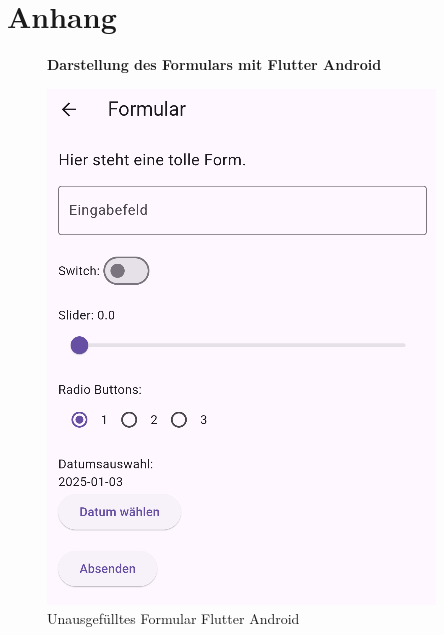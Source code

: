 \section*{Anhang}
\begin{figure}[H]
    \centering
    \textbf{Darstellung des Formulars mit Flutter Android}\par\vspace{0.5cm}
    \begin{minipage}{0.45\textwidth}
        \centering
        \includegraphics[width=\linewidth]{images/form/android/flutter/form.png}
        \caption{Unausgefülltes Formular Flutter Android}
    \end{minipage}
    \hfill
    \begin{minipage}{0.45\textwidth}
        \centering

\end{minipage}
\end{figure}

